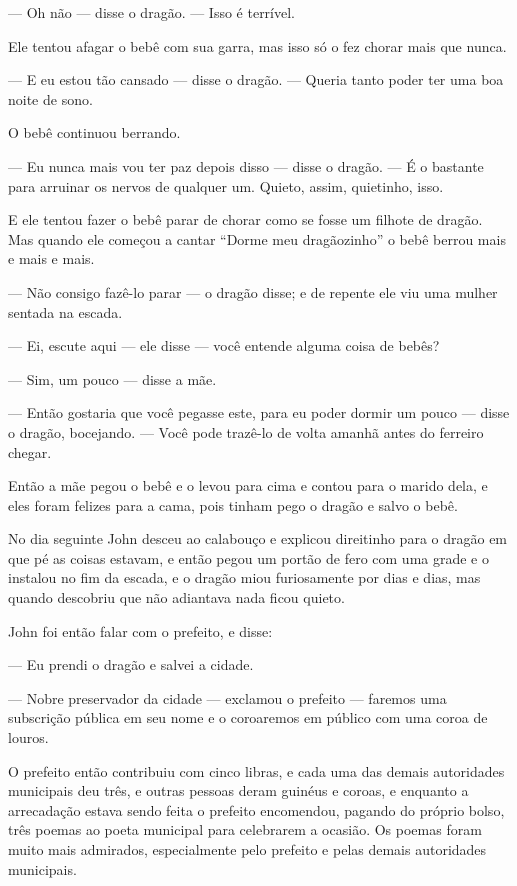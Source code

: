 — Oh não — disse o dragão. — Isso é terrível. 

Ele tentou afagar o bebê com sua garra, mas isso só o fez chorar mais
que nunca.

— E eu estou tão cansado — disse o dragão. — Queria tanto poder ter
uma boa noite de sono.

O bebê continuou berrando.

— Eu nunca mais vou ter paz depois disso — disse o dragão. — É o
bastante para arruinar os nervos de qualquer um. Quieto, assim,
quietinho, isso.

E ele tentou fazer o bebê parar de chorar como se fosse um filhote de
dragão. Mas quando ele começou a cantar “Dorme meu dragãozinho” o
bebê berrou mais e mais e mais.

— Não consigo fazê-lo parar — o dragão disse; e de repente ele viu uma
mulher sentada na escada.

— Ei, escute aqui — ele disse — você entende alguma coisa de bebês?

— Sim, um pouco — disse a mãe.

— Então gostaria que você pegasse este, para eu poder dormir um pouco
— disse o dragão, bocejando. — Você pode trazê-lo de volta amanhã
antes do ferreiro chegar.

Então a mãe pegou o bebê e o levou para cima e contou para o marido
dela, e eles foram felizes para a cama, pois tinham pego o dragão e
salvo o bebê.

No dia seguinte John desceu ao calabouço e explicou direitinho para o
dragão em que pé as coisas estavam, e então pegou um portão de fero
com uma grade e o instalou no fim da escada, e o dragão miou
furiosamente por dias e dias, mas quando descobriu que não adiantava
nada ficou quieto.

John foi então falar com o prefeito, e disse:

— Eu prendi o dragão e salvei a cidade.

— Nobre preservador da cidade — exclamou o prefeito — faremos uma
subscrição pública em seu nome e o coroaremos em público com uma
coroa de louros.

O prefeito então contribuiu com cinco libras, e cada uma das demais
autoridades municipais deu três, e outras pessoas deram guinéus e
coroas, e enquanto a arrecadação estava sendo feita o prefeito
encomendou, pagando do próprio bolso, três poemas ao poeta municipal
para celebrarem a ocasião. Os poemas foram muito mais admirados,
especialmente pelo prefeito e pelas demais autoridades municipais.

